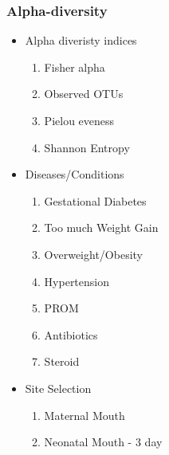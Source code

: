 \documentclass{beamer}
\begin{document}
    \begin{frame}
        \frametitle{Alpha-diversity}

        \begin{itemize}
            \item Alpha diveristy indices
            \begin{enumerate}
                \item Fisher alpha
                \item Observed OTUs
                \item Pielou eveness
                \item Shannon Entropy
            \end{enumerate}

            \item Diseases/Conditions
            \begin{enumerate}
                \item Gestational Diabetes
                \item Too much Weight Gain
                \item Overweight/Obesity
                \item Hypertension
                \item PROM
                \item Antibiotics
                \item Steroid
            \end{enumerate}

            \item Site Selection
            \begin{enumerate}
                \item Maternal Mouth
                \item Neonatal Mouth - 3 day
            \end{enumerate}
        \end{itemize}
    \end{frame}
\end{document}
